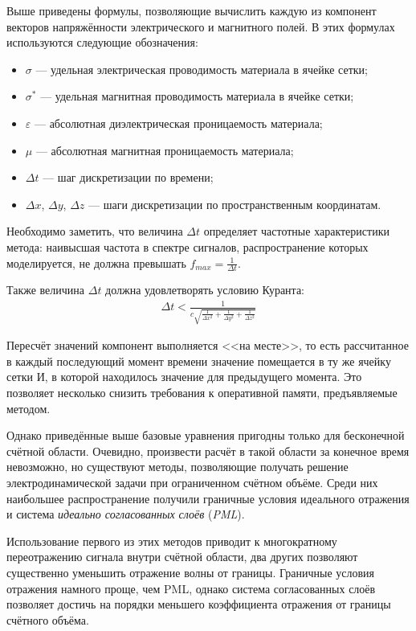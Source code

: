 Выше приведены формулы, позволяющие вычислить каждую из компонент векторов напряжённости электрического и магнитного полей. В этих формулах используются следующие обозначения:
\begin{itemize}[label={}]
\item $ \sigma $ --- удельная электрическая проводимость материала в ячейке сетки;
\item $ \sigma^{*} $ --- удельная магнитная проводимость материала в ячейке сетки;
\item $ \varepsilon $ --- абсолютная диэлектрическая проницаемость материала;
\item $ \mu $ --- абсолютная магнитная проницаемость материала;
\item $ \Delta{t} $ --- шаг дискретизации по времени;
\item $ \Delta{x} $, $ \Delta{y} $, $ \Delta{z} $ --- шаги дискретизации по пространственным координатам.
\end{itemize}

Необходимо заметить, что величина $ \Delta{t} $ определяет частотные характеристики метода: наивысшая частота в спектре сигналов, распространение которых моделируется, не должна превышать $ f_{max} = \frac{1}{\Delta{t}} $.

Также величина $ \Delta{t} $ должна удовлетворять условию Куранта:
\begin{align*}
\Delta{t} < \frac{1}{c\sqrt{\frac{1}{\Delta{x}^2} + \frac{1}{\Delta{y}^2} + \frac{1}{\Delta{z}^2}}}
\end{align*}

Пересчёт значений компонент выполняется <<на месте>>, то есть рассчитанное в каждый последующий момент времени значение помещается в ту же ячейку сетки И, в которой находилось значение для предыдущего момента. Это позволяет несколько снизить требования к оперативной памяти, предъявляемые методом.

Однако приведённые выше базовые уравнения пригодны только для
бесконечной счётной области. Очевидно, произвести расчёт в такой области за конечное время невозможно, но существуют методы,
позволяющие получать решение электродинамической задачи при ограниченном счётном объёме. Среди них наибольшее распространение получили 
граничные условия идеального отражения и система \textit{идеально согласованных слоёв} (\textit{PML}).

Использование первого из этих методов приводит к многократному переотражению
сигнала внутри счётной области, два других позволяют существенно уменьшить 
отражение волны от границы. Граничные условия отражения намного проще, чем PML, однако система согласованных слоёв позволяет достичь на порядки меньшего
коэффициента отражения от границы счётного объёма.

